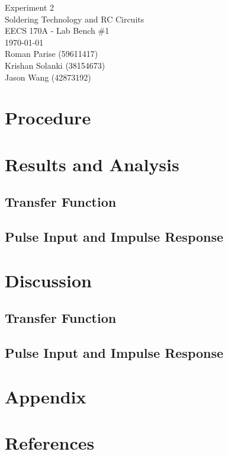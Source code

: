 \documentclass{article}
\begin{document}
	\begin{titlepage}
		\centering
		\Huge{Experiment 2} \\
		\huge{Soldering Technology and RC Circuits} \\
		\vspace{1cm}
		\large{EECS 170A - Lab Bench \#1} \\
		\large{\today} \\
		\vspace{1cm}
		\normalsize{Roman Parise (59611417)} \\
		\normalsize{Krishan Solanki (38154673)} \\
		\normalsize{Jason Wang (42873192)} \\
	\end{titlepage}
	\section{Procedure}
	
	\section{Results and Analysis}
	\subsection{Transfer Function}
	\subsection{Pulse Input and Impulse Response}
	
	\section{Discussion}
	\subsection{Transfer Function}
	\subsection{Pulse Input and Impulse Response}
	
	\section{Appendix}
	
	\section{References}
	
\end{document}
